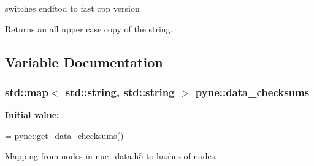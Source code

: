 switches endftod to fast cpp version 

Returns an all upper case copy of the string. 

\subsection{Variable Documentation}
\hypertarget{namespacepyne_a092bde815498a51a7532e3021a63ede5}{
\subsubsection[{data\-\_\-checksums}]{\setlength{\rightskip}{0pt plus 5cm}std\-::map$<$ std\-::string, std\-::string $>$ pyne\-::data\-\_\-checksums}}\label{namespacepyne_a092bde815498a51a7532e3021a63ede5}
{\bfseries Initial value\-:}
\begin{DoxyCode}
=
  pyne::get\_data\_checksums()
\end{DoxyCode}


Mapping from nodes in nuc\-\_\-data.\-h5 to hashes of nodes. 

